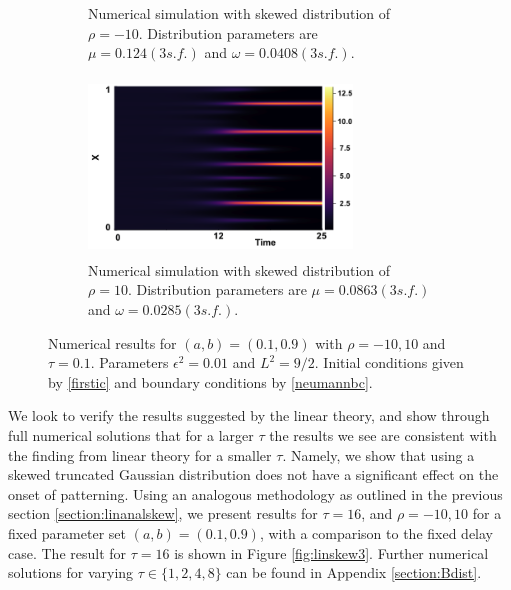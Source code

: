 \begin{figure}[H]
\begin{subfigure}[t]{0.45\textwidth}
        \caption{Numerical simulation with skewed distribution of $\rho=-10$. Distribution parameters are $\mu=0.124(3 s.f.)$ and $\omega=0.0408(3 s.f.)$.}
        \label{fig:rhom10}
    \end{subfigure}
    \hfill
    \begin{subfigure}[t]{0.45\textwidth}
        \centering
        \includegraphics[width=7cm,height=4.75cm]{skew10.png}
        \caption{Numerical simulation with skewed distribution of $\rho=10$. Distribution parameters are $\mu=0.0863(3 s.f.)$ and $\omega=0.0285(3 s.f.)$.}
        \label{fig:rho10}
    \end{subfigure}
    \caption{Numerical results for $(a,b)=(0.1,0.9)$ with $\rho=-10,10$ and $\tau=0.1$. Parameters $\epsilon^2=0.01$ and $L^2=9/2$. Initial conditions given by \eqref{firstic} and boundary conditions by \eqref{neumannbc}.}
    \label{fig:linskew1}
\end{figure}

We look to verify the results suggested by the linear theory, and show through full numerical solutions that for a larger $\tau$ the results we see are consistent with the finding from linear theory for a smaller $\tau$. Namely, we show that using a skewed truncated Gaussian distribution does not have a significant effect on the onset of patterning. Using an analogous methodology as outlined in the previous section \ref{section:linanalskew}, we present results for $\tau=16$, and $\rho=-10,10$ for a fixed parameter set $(a,b)=(0.1,0.9)$, with a comparison to the fixed delay case. The result for $\tau=16$ is shown in Figure \ref{fig:linskew3}. Further numerical solutions for varying $\tau\in\{1,2,4,8\}$ can be found in Appendix \ref{section:Bdist}.

